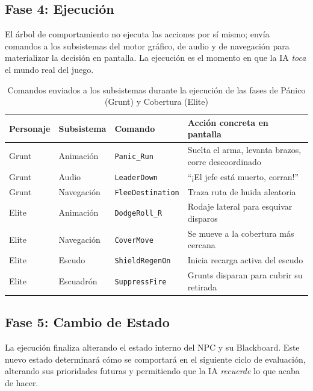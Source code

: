 \documentclass[12pt,letterpaper]{article}
\begin{document}
\subsection{Fase 4: Ejecución}

El árbol de comportamiento no ejecuta las acciones por sí mismo; envía comandos a los subsistemas del motor gráfico, de audio y de navegación para materializar la decisión en pantalla. La ejecución es el momento en que la IA \textit{toca} el mundo real del juego.

\begin{table}[H]
\centering
\caption{Comandos enviados a los subsistemas durante la ejecución de las fases de Pánico (Grunt) y Cobertura (Elite)}
\scriptsize
\begin{tabularx}{\textwidth}{L{1.2cm}L{1.4cm}L{2.8cm}Y}
\toprule
\textbf{Personaje} & \textbf{Subsistema} & \textbf{Comando} & \textbf{Acción concreta en pantalla} \\
\midrule
Grunt & Animación & \footnotesize\texttt{Panic\_Run} & Suelta el arma, levanta brazos, corre descoordinado \\
Grunt & Audio & \footnotesize\texttt{LeaderDown} & ``¡El jefe está muerto, corran!'' \\
Grunt & Navegación & \footnotesize\texttt{FleeDestination} & Traza ruta de huida aleatoria \\
\midrule
Elite & Animación & \footnotesize\texttt{DodgeRoll\_R} & Rodaje lateral para esquivar disparos \\
Elite & Navegación & \footnotesize\texttt{CoverMove} & Se mueve a la cobertura más cercana \\
Elite & Escudo & \footnotesize\texttt{ShieldRegenOn} & Inicia recarga activa del escudo \\
Elite & Escuadrón & \footnotesize\texttt{SuppressFire} & Grunts disparan para cubrir su retirada \\
\bottomrule
\end{tabularx}
\end{table}

\subsection{Fase 5: Cambio de Estado}

La ejecución finaliza alterando el estado interno del NPC y su Blackboard. Este nuevo estado determinará cómo se comportará en el siguiente ciclo de evaluación, alterando sus prioridades futuras y permitiendo que la IA \textit{recuerde} lo que acaba de hacer.
\end{document}
